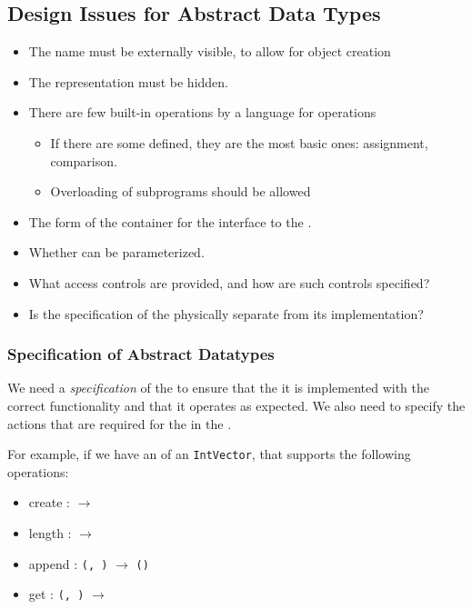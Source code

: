 \subsection{Design Issues for Abstract Data Types}\label{subsec:Abstract_Data_Type_Design_Issues}
\begin{itemize}[noitemsep]
\item The  name must be externally visible, to allow for object creation
\item The  representation must be hidden.
\item There are few built-in operations by a language for  operations
  \begin{itemize}[noitemsep]
  \item If there are some defined, they are the most basic ones: assignment, comparison.
  \item Overloading of subprograms should be allowed
  \end{itemize}
\item The form of the container for the interface to the .
\item Whether  can be parameterized.
\item What access controls are provided, and how are such controls specified?
\item Is the specification of the  physically separate from its implementation?
\end{itemize}

\subsubsection{Specification of Abstract Datatypes}\label{subsubsec:Specification_Abstract_Datatype}
\begin{definition}[Specification]\label{def:ADT_Specification}
  We need a \emph{specification} of the  to ensure that the it is implemented with the correct functionality and that it operates as expected.
  We also need to specify the actions that are required for the  in the .
\end{definition}

For example, if we have an  of an \texttt{IntVector}, that supports the following operations:
\begin{itemize}[noitemsep]
\item create : \texttt{} $\rightarrow$ \texttt{}
\item length : \texttt{} $\rightarrow$ \texttt{}
\item append : \texttt{(, )} $\rightarrow$ \texttt{()}
\item get : \texttt{(, )} $\rightarrow$ \texttt{}
\end{itemize}

